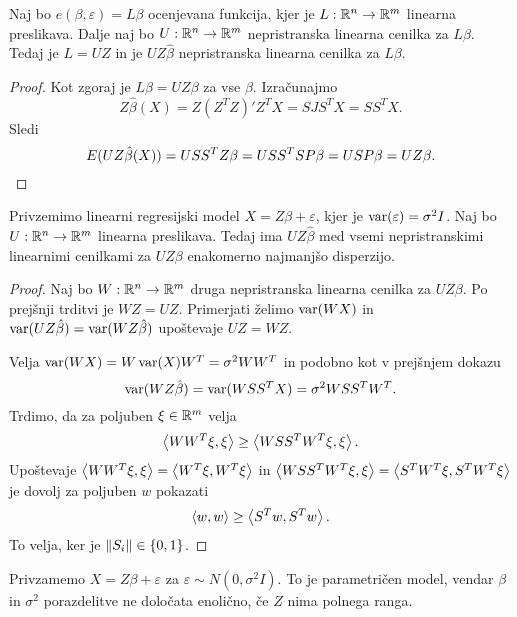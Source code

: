 \begin{trditev}
  Naj bo $e(\beta, \varepsilon) = L \beta$ ocenjevana funkcija, kjer je $L: \mathbb{R}^n
  \to \mathbb{R}^m$ linearna preslikava.
  Dalje naj bo $U: \mathbb{R}^n \to \mathbb{R}^m$ nepristranska linearna cenilka za $L \beta$.
  Tedaj je $L = UZ$ in je $U Z \hat{\beta}$ nepristranska linearna cenilka za $L
  \beta$.
\end{trditev}

\begin{proof}
  Kot zgoraj je $L \beta = U Z \beta$ za vse $\beta$.
  Izračunajmo
  \[
	Z \hat{\beta}(X) = Z (Z^T Z)' Z^T X
	= SJS^T X = S S^T X.
  \]
  Sledi
  \[
	E(U Z \hat{\beta}(X)) = U S S^T Z \beta
	= U S S^T S P \beta = U S P \beta = U Z \beta.
	\qedhere
  \]
\end{proof}

\begin{izrek}
  Privzemimo linearni regresijski model $X = Z \beta + \varepsilon$, kjer je
  $\operatorname{var}(\varepsilon) = \sigma^2 I$.
  Naj bo $U: \mathbb{R}^n \to \mathbb{R}^m$ linearna preslikava.
  Tedaj ima $U Z \hat{\beta}$ med vsemi nepristranskimi linearnimi cenilkami za
  $U Z \beta$ enakomerno najmanjšo disperzijo.
\end{izrek}

\begin{proof}
  Naj bo $W: \mathbb{R}^n \to \mathbb{R}^m$ druga nepristranska linearna cenilka za $U Z \beta$.
  Po prejšnji trditvi je $WZ = UZ$.
  Primerjati želimo $\operatorname{var}(WX)$ in $\operatorname{var}(UZ\hat{\beta}) = \operatorname{var}(W Z \hat{\beta})$
  upoštevaje $UZ = WZ$.

  Velja $\operatorname{var}(W X) = W \operatorname{var}(X) W^T = \sigma^2 W W^T$ in podobno kot v prejšnjem
  dokazu
  \[
	\operatorname{var}(WZ\hat{\beta}) = \operatorname{var}(W S S^T X) = \sigma^2 W S S^T W^T.
  \]
  Trdimo, da za poljuben $\xi \in \mathbb{R}^m$ velja
  \[
	\left< W W^T \xi, \xi \right> \ge \left< W S S^T W^T \xi, \xi \right>.
  \]
  Upoštevaje $\left< W W^T \xi, \xi \right> = \left< W^T \xi, W^T \xi \right>$ in $\left< W S S^T W^T
	\xi, \xi \right> = \left< S^T W^T \xi, S^T W^T \xi \right>$ je dovolj za poljuben $w$
  pokazati
  \[
	\left< w, w \right> \ge \left< S^T w, S^T w \right>.
  \]
  To velja, ker je $\left\lVert S_i\right\rVert \in \{0, 1\}$.
\end{proof}


Privzamemo $X = Z \beta + \varepsilon$ za $\varepsilon \sim N(0, \sigma^2 I)$.
To je parametričen model, vendar $\beta$ in $\sigma^2$ porazdelitve ne določata
enolično, če $Z$ nima polnega ranga.


